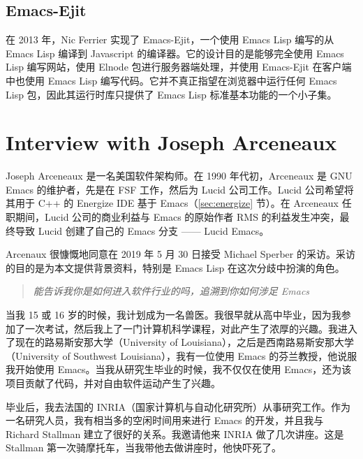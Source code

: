 \documentclass[format=acmsmall,screen]{acmart}
\begin{document}
\subsection{Emacs-Ejit}

在 2013 年，Nic Ferrier 实现了 Emacs-Ejit，一个使用 Emacs Lisp 编写的从 Emacs Lisp 编译到 Javascript 的编译器。它的设计目的是能够完全使用 Emacs Lisp 编写网站，使用 Elnode 包进行服务器端处理，并使用 Emacs-Ejit 在客户端中也使用 Emacs Lisp 编写代码。它并不真正指望在浏览器中运行任何 Emacs Lisp 包，因此其运行时库只提供了 Emacs Lisp 标准基本功能的一个小子集。

\section{Interview with Joseph Arceneaux}
\label{appendix:arceneaux}
\newenvironment{question}{\begin{quote}\itshape}{\end{quote}}

Joseph Arceneaux 是一名美国软件架构师。在 1990 年代初，Arceneaux 是 GNU Emacs 的维护者，先是在 FSF 工作，然后为 Lucid 公司工作。Lucid 公司希望将其用于 C++ 的 Energize IDE 基于 Emacs（\ref{sec:energize} 节）。在 Arceneaux 任职期间，Lucid 公司的商业利益与 Emacs 的原始作者 RMS 的利益发生冲突，最终导致 Lucid 创建了自己的 Emacs 分支 —— Lucid Emacs。

Arcenaux 很慷慨地同意在 2019 年 5 月 30 日接受 Michael Sperber 的采访。采访的目的是为本文提供背景资料，特别是 Emacs Lisp 在这次分歧中扮演的角色。

%
\begin{question}
能告诉我你是如何进入软件行业的吗，追溯到你如何涉足 Emacs
\end{question}
%

当我 15 或 16 岁的时候，我计划成为一名兽医。我很早就从高中毕业，因为我参加了一次考试，然后我上了一门计算机科学课程，对此产生了浓厚的兴趣。我进入了现在的路易斯安那大学（University of Louisiana），之后是西南路易斯安那大学（University of Southwest Louisiana），我有一位使用 Emacs 的芬兰教授，他说服我开始使用 Emacs。当我从研究生毕业的时候，我不仅仅在使用 Emacs，还为该项目贡献了代码，并对自由软件运动产生了兴趣。

毕业后，我去法国的 INRIA（国家计算机与自动化研究所）从事研究工作。作为一名研究人员，我有相当多的空闲时间用来进行 Emacs 的开发，并且我与 Richard Stallman 建立了很好的关系。我邀请他来 INRIA 做了几次讲座。这是 Stallman 第一次骑摩托车，当我带他去做讲座时，他快吓死了。
\end{document}
